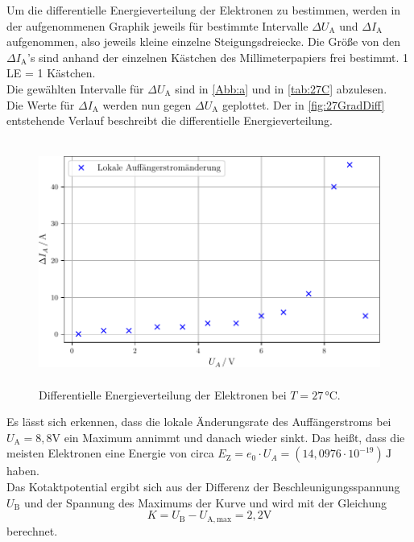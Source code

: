 Um die differentielle Energieverteilung der Elektronen zu bestimmen, werden in der aufgenommenen 
Graphik jeweils für bestimmte Intervalle $\Delta U_{\mathrm{A}}$ und $\Delta I_{\mathrm{A}}$ aufgenommen, also jeweils
kleine einzelne Steigungsdreiecke. Die Größe von den $\Delta I_{\mathrm{A}}$'s 
sind anhand der einzelnen Kästchen des Millimeterpapiers frei bestimmt. 1 LE = 1 Kästchen.\\
Die gewählten Intervalle für $\Delta U_{\mathrm{A}}$ sind in \autoref{Abb:a} und in \autoref{tab:27C} abzulesen.\\
Die Werte für $\Delta I_{\mathrm{A}}$ werden nun gegen $\Delta U_{\mathrm{A}}$ geplottet. Der in \autoref{fig:27GradDiff} entstehende Verlauf
beschreibt die differentielle Energieverteilung.\\

\begin{figure}[H]
  \centering
  \includegraphics[height=8cm]{build/27Grad.pdf}
  \caption{Differentielle Energieverteilung der Elektronen bei $T=27\,\si{\celsius}$.}
  \label{fig:27GradDiff}
\end{figure}

Es lässt sich erkennen, dass die lokale Änderungsrate des Auffängerstroms
bei $U_{\mathrm{A}} = 8,8 \si{\volt}$ ein Maximum annimmt und danach wieder sinkt. Das heißt,
dass die meisten Elektronen eine Energie von circa $E_{\mathrm{Z}} = e_0 \cdot U_A = (14,0976 \cdot 10^{-19}) \, \si{\joule}$
haben.\\
Das Kotaktpotential ergibt sich aus der Differenz der Beschleunigungsspannung $U_{\mathrm{B}}$ und der Spannung
des Maximums der Kurve und wird mit der Gleichung
\begin{equation}
  K = U_{\mathrm{B}} - U_{\mathrm{A,max}} = 2,2 \si{\volt}
\end{equation}
berechnet.\\

